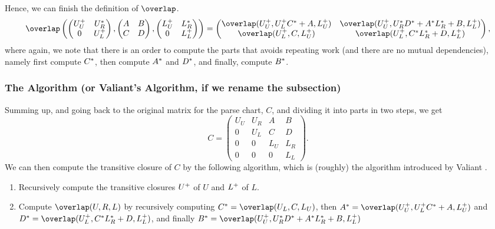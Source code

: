 Hence, we can finish the definition of $\overlap$.
\begin{equation}
  \overlap
  \left( 
  \begin{pmatrix}
    \tc{U_U} & \rc{U_R} \\
    0        & \tc{U_L}
  \end{pmatrix} 
  ,
   \begin{pmatrix}
    A & B \\ 
    C & D
  \end{pmatrix}
  ,
  \begin{pmatrix}
    \tc{L_U} & \rc{L_R} \\
    0        & \tc{L_L}
  \end{pmatrix}
  \right)
  = 
  \begin{pmatrix}
    \overlap( \tc{U_U} , \tc{U_L}\rc{C} + A                  , \tc{L_U} ) & 
    \overlap( \tc{U_U} , \rc{U_R}\rc{D} + \rc{A}\rc{L_R} + B , \tc{L_L} ) \\
    \overlap( \tc{U_L} , C                                   , \tc{L_U} ) & 
    \overlap( \tc{U_L} , \rc{C}\rc{L_R} +  D                 , \tc{L_L} )
  \end{pmatrix},
\end{equation}
where again, we note that there is an order to compute the parts that avoids repeating work (and there are no mutual dependencies), namely first compute $C^*$, then compute $A^*$ and $D^*$, and finally, compute $B^*$.

\subsubsection{The Algorithm (or Valiant's Algorithm, if we rename the subsection)}
Summing up, and going back to the original matrix for the parse chart, $C$, and dividing it into parts in two steps, we get
\begin{equation}
  C =
  \begin{pmatrix}
    U_U & U_R & A   & B \\
    0   & U_L & C   & D \\
    0   &   0 & L_U & L_R \\
    0   &   0 & 0   & L_L 
  \end{pmatrix}.
\end{equation}
We can then compute the transitive closure of $C$ by the following algorithm, which is (roughly) the algorithm introduced by Valiant \cite{Valiant}.
\begin{enumerate}
\item Recursively compute the transitive closures $U^+$ of $U$ and $L^+$ of $L$.
\item Compute $\overlap(U,R,L)$ by recursively computing $\rc{C} = \overlap(U_L, C, L_U)$, then $\rc{A} = \overlap( \tc{U_U} , \tc{U_L}\rc{C} + A , \tc{L_U} )$ and $\rc{D} = \overlap( \tc{U_L} , \rc{C}\rc{L_R} +  D , \tc{L_L} )$, and finally $\rc{B} = \overlap( \tc{U_U} , \rc{U_R}\rc{D} + \rc{A}\rc{L_R} + B , \tc{L_L})$ 
\end{enumerate}
